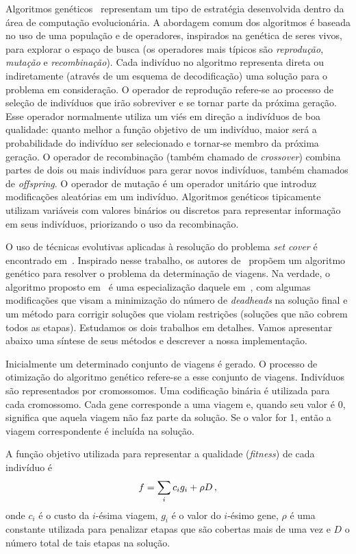 Algoritmos genéticos~\cite{holland75, goldberg89} representam um tipo de estratégia desenvolvida
dentro da área de computação evolucionária. A abordagem comum dos algoritmos é baseada no uso de uma
população e de operadores, inspirados na genética de seres vivos, para explorar o espaço de busca
(os operadores mais típicos são {\it reprodução}, {\it mutação} e {\it recombinação}). Cada
indivíduo no algoritmo representa direta ou indiretamente (através de um esquema de decodificação)
uma solução para o problema em consideração. O operador de reprodução refere-se ao processo de
seleção de indivíduos que irão sobreviver e se tornar parte da próxima geração. Esse operador
normalmente utiliza um viés em direção a indivíduos de boa qualidade: quanto melhor a função
objetivo de um indivíduo, maior será a probabilidade do indivíduo ser selecionado e tornar-se membro
da próxima geração. O operador de recombinação (também chamado de {\it crossover}) combina partes de
dois ou mais indivíduos para gerar novos indivíduos, também chamados de {\it offspring}. O operador
de mutação é um operador unitário que introduz modificações aleatórias em um indivíduo. Algoritmos
genéticos tipicamente utilizam variáveis com valores binários ou discretos para representar
informação em seus indivíduos, priorizando o uso da recombinação.

O uso de técnicas evolutivas aplicadas à resolução do problema {\it set cover} é encontrado
em~\cite{beasley96}. Inspirado nesse trabalho, os autores de~\cite{kornilakis02} propõem um
algoritmo genético para resolver o problema da determinação de viagens. Na verdade, o algoritmo
proposto em~\cite{kornilakis02} é uma especialização daquele em~\cite{beasley96}, com algumas
modificações que visam a minimização do número de {\it deadheads} na solução final e um método para
corrigir soluções que violam restrições (soluções que não cobrem todos as etapas). Estudamos os dois
trabalhos em detalhes. Vamos apresentar abaixo uma síntese de seus métodos e descrever a nossa
implementação.

Inicialmente um determinado conjunto de viagens é gerado. O processo de otimização do algoritmo
genético refere-se a esse conjunto de viagens. Indivíduos são representados por cromossomos. Uma
codificação binária é utilizada para cada cromossomo. Cada gene corresponde a uma viagem e, quando 
seu valor é 0, significa que aquela viagem não faz parte da solução. Se o valor for 1, então a 
viagem correspondente é incluída na solução.

A função objetivo utilizada para representar a qualidade ({\it fitness}) de cada indivíduo é
%
\begin{equation*}
	f = \sum_i c_i g_i + \rho D \, ,
\end{equation*}
%
onde $c_i$ é o custo da $i$-ésima viagem, $g_i$ é o valor do $i$-ésimo gene, $\rho$ é uma
constante utilizada para penalizar etapas que são cobertas mais de uma vez e $D$ o número total de
tais etapas na solução.


